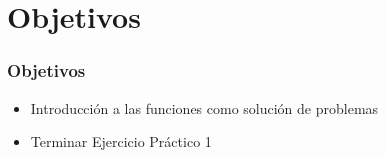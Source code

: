 \section{Objetivos}

\begin{frame}
\frametitle{Objetivos}

\begin{itemize}
	\item Introducción a las funciones como solución de problemas
	\item Terminar Ejercicio Práctico 1
\end{itemize}

\end{frame}
